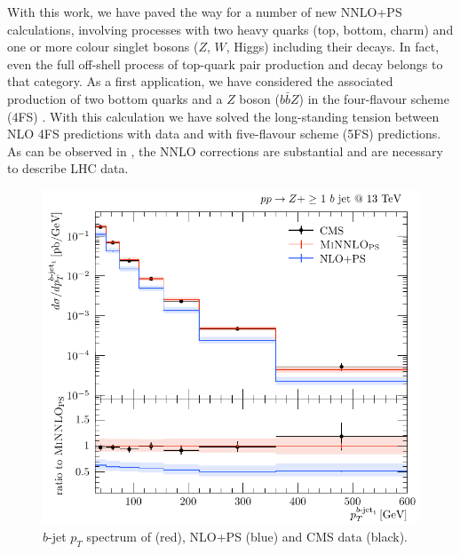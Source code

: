\documentclass{FBR_Bericht_2025}
\begin{document}
\begin{refsection}
With this work, we have paved the way for a number of new NNLO+PS calculations, involving processes with two heavy quarks (top, bottom, charm) 
and one or more colour singlet bosons ($Z$, $W$, Higgs) including their decays. In fact, even the full off-shell process of top-quark pair production 
and decay belongs to that category. As a first application, we have considered the associated production of two bottom quarks and a $Z$ boson ($b\bar{b}Z$)
in the four-flavour scheme (4FS) \cite{Mazzitelli:2024ura}. With this calculation we have solved the long-standing tension between NLO 4FS predictions with data and with five-flavour scheme (5FS) predictions. 
As can be observed in , the NNLO corrections are substantial and are necessary to describe LHC data.

\begin{figure}[bh]
\begin{center}
\includegraphics[width=0.95\linewidth]{plots/bbZ_ptbjet.pdf}
\caption{$b$-jet $p_T$ spectrum of \minnlo{} (red), NLO+PS (blue) and CMS data (black).}
\label{fig:bbZ}
\end{center}
\end{figure}



\end{refsection}
\end{document}
